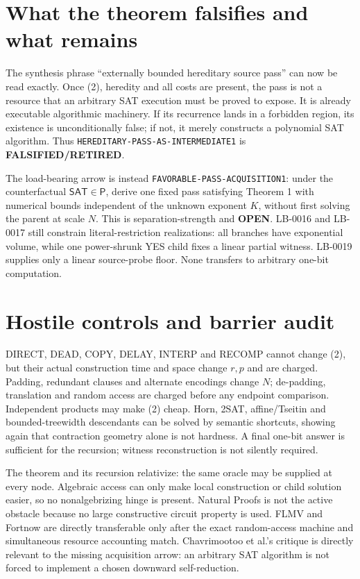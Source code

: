 \documentclass[11pt]{article}
\newcommand{\SAT}{\mathsf{SAT}}
\newcommand{\OPEN}{\textbf{OPEN}}
\newcommand{\RETIRED}{\textbf{FALSIFIED/RETIRED}}
\begin{document}
\section{What the theorem falsifies and what remains}

The synthesis phrase ``externally bounded hereditary source pass'' can now be
read exactly.  Once (2), heredity and all costs are present, the pass is not a
resource that an arbitrary SAT execution must be proved to expose.  It is
already executable algorithmic machinery.  If its recurrence lands in a
forbidden region, its existence is unconditionally false; if not, it merely
constructs a polynomial SAT algorithm.  Thus
\texttt{HEREDITARY-PASS-AS-INTERMEDIATE1} is \RETIRED.

The load-bearing arrow is instead
\texttt{FAVORABLE-PASS-ACQUISITION1}: under the counterfactual
$\SAT\in\mathsf P$, derive one fixed pass satisfying Theorem 1 with numerical
bounds independent of the unknown exponent $K$, without first solving the
parent at scale $N$.  This is separation-strength and \OPEN.  LB-0016 and
LB-0017 still constrain literal-restriction realizations: all branches have
exponential volume, while one power-shrunk YES child fixes a linear partial
witness.  LB-0019 supplies only a linear source-probe floor.  None transfers
to arbitrary one-bit computation.

\section{Hostile controls and barrier audit}

DIRECT, DEAD, COPY, DELAY, INTERP and RECOMP cannot change (2), but their
actual construction time and space change $r,p$ and are charged.  Padding,
redundant clauses and alternate encodings change $N$; de-padding,
translation and random access are charged before any endpoint comparison.
Independent products may make (2) cheap.  Horn, 2SAT, affine/Tseitin and
bounded-treewidth descendants can be solved by semantic shortcuts, showing
again that contraction geometry alone is not hardness.  A final one-bit
answer is sufficient for the recursion; witness reconstruction is not
silently required.

The theorem and its recursion relativize: the same oracle may be supplied at
every node.  Algebraic access can only make local construction or child
solution easier, so no nonalgebrizing hinge is present.  Natural Proofs is not
the active obstacle because no large constructive circuit property is used.
FLMV and Fortnow are directly transferable only after the exact random-access
machine and simultaneous resource accounting match.  Chavrimootoo et al.'s
critique is directly relevant to the missing acquisition arrow: an arbitrary
SAT algorithm is not forced to implement a chosen downward self-reduction.
\end{document}
